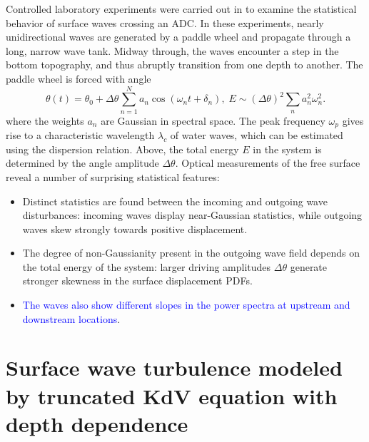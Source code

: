 \documentclass[9pt,twocolumn,twoside,lineno]{pnas-new}
\begin{document}
Controlled laboratory experiments were carried out in  \cite{bolles2018anomalous} to examine the statistical behavior of surface waves crossing an ADC. In these experiments, nearly unidirectional waves are generated by a paddle wheel and propagate through a long, narrow wave tank. Midway through, the waves encounter a step in the bottom topography, and thus abruptly transition from one depth to another. The paddle wheel is forced with angle
\[
\theta\left(t\right)=\theta_{0}+\Delta\theta\sum_{n=1}^{N}a_{n}\cos\left(\omega_{n}t+\delta_{n}\right),\;E\sim\left(\Delta\theta\right)^{2}\sum_{n}a_{n}^{2}\omega_{n}^{2}.
\]
where the weights $a_n$ are Gaussian in spectral space. The peak frequency $\omega_p$ gives rise to a characteristic wavelength $\lambda_c$ of water waves, which can be estimated using the dispersion relation.
Above, the total energy $E$ in the system is determined by the angle amplitude
$\Delta\theta$. Optical measurements of the free surface reveal a number of surprising statistical features:
\begin{itemize}
\item Distinct statistics are found between the incoming and outgoing wave
disturbances: incoming waves display near-Gaussian statistics,
while outgoing waves skew strongly towards positive displacement.
\item The degree of non-Gaussianity present in the outgoing wave field depends on the total energy of the system: 
larger driving amplitudes $\Delta\theta$ generate stronger skewness in the surface displacement PDFs.
\item \textcolor{blue}{The waves also show different slopes in the power spectra at upstream and downstream locations}.


\end{itemize}

\section{Surface wave turbulence modeled by truncated KdV equation with depth dependence\label{sec:Surface-wave-turbulence}}
\end{document}
